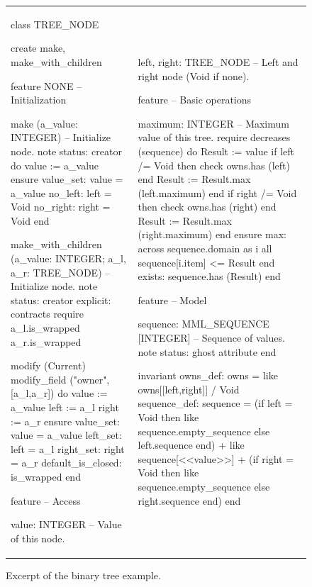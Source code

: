 \begin{figure}
\begin{adjustwidth}{-4pt}{-4pt}
\begin{tabular}{ll}
{\begin{erunning}[basicstyle=\scriptsize,numbers=left]
class TREE_NODE

create
	make, make_with_children

feature {NONE} -- Initialization

	make (a_value: INTEGER)
			-- Initialize node.
		note
			status: creator
		do
			value := a_value
		ensure
			value_set: value = a_value
			no_left: left = Void
			no_right: right = Void
		end

	make_with_children (a_value: INTEGER; 
			    a_l, a_r: TREE_NODE)
			-- Initialize node.
		note
			status: creator
			explicit: contracts
		require
			a_l.is_wrapped
			a_r.is_wrapped

			modify (Current)
			modify_field ("owner",[a_l,a_r])
		do
			value := a_value
			left := a_l
			right := a_r
		ensure
			value_set: value = a_value
			left_set: left = a_l
			right_set: right = a_r
			default_is_closed: is_wrapped
		end

feature -- Access

	value: INTEGER
			-- Value of this node.
\end{erunning}}
&
\hspace{4mm}
{\begin{erunning}[basicstyle=\scriptsize,numbers=left,firstnumber=last]

	left, right: TREE_NODE
			-- Left and right node (Void if none).

feature -- Basic operations

	maximum: INTEGER
			-- Maximum value of this tree.
		require
			decreases (sequence)
		do
			Result := value
			if left /= Void then
				check owns.has (left) end
				Result := Result.max (left.maximum)
			end
			if right /= Void then
				check owns.has (right) end
				Result := Result.max (right.maximum)
			end
		ensure
			max: across sequence.domain as i all 
			              sequence[i.item] <= Result end
			exists: sequence.has (Result)
		end

feature -- Model

	sequence: MML_SEQUENCE [INTEGER]
			-- Sequence of values.
		note
			status: ghost
		attribute
		end

invariant
	owns_def: owns = {like owns}[[left,right]] / Void
	sequence_def: sequence =
		(if left = Void 
		   then {like sequence}.empty_sequence 
		   else left.sequence end) +
		{like sequence}[<<value>>] +
		(if right = Void 
		   then {like sequence}.empty_sequence 
		   else right.sequence end)
end
\end{erunning}}
\end{tabular}
\end{adjustwidth}
\caption{Excerpt of the binary tree example.}
\label{code:tree_node}
\end{figure}





